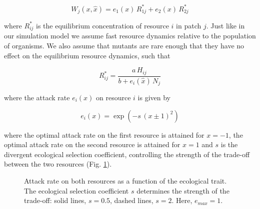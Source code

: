 \begin{equation}
    W_j(x, \hat{x}) = e_1(x) \, R^*_{1j} + e_2(x) \, R^*_{2j}
\end{equation}

where $R^*_{ij}$ is the equilibrium concentration of resource $i$ in patch $j$. Just like in our simulation model we assume fast resource dynamics relative to the population of organisms. We also assume that mutants are rare enough that they have no effect on the equilibrium resource dynamics, such that

\begin{equation}
    R^*_{ij} = \frac{a \, H_{ij}}{b + e_i(\hat{x})\,N_j}
\end{equation}

where the attack rate $e_i(x)$ on resource $i$ is given by

\begin{equation}
    e_i(x) = \exp{(-s\,(x \pm 1)^2)}
\end{equation}

where the optimal attack rate on the first resource is attained for $x = -1$, the optimal attack rate on the second resource is attained for $x = 1$ and $s$ is the divergent ecological selection coefficient, controlling the strength of the trade-off between the two resources (Fig. \ref{fig:attack_rates}).\\

\begin{figure}
    \begin{center}
        \end{center}
    \label{fig:attack_rates}
    \caption{Attack rate on both resources as a function of the ecological trait. The ecological selection coefficient $s$ determines the strength of the trade-off: solid lines, $s = 0.5$, dashed lines, $s = 2$. Here, $e_{max} = 1$.}
\end{figure}


